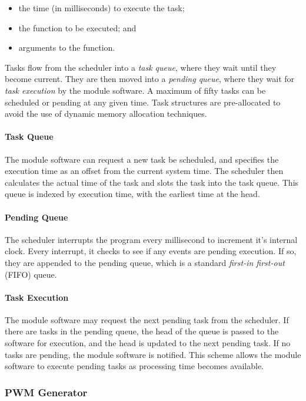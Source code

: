 \begin{itemize}
	\item the time (in milliseconds) to execute the task;
	\item the function to be executed; and
	\item arguments to the function.
\end{itemize}

Tasks flow from the scheduler into a \emph{task queue}, where they wait until they become current. They are then moved into a \emph{pending queue}, where they wait for \emph{task execution} by the module software. A maximum of fifty tasks can be scheduled or pending at any given time. Task structures are pre-allocated to avoid the use of dynamic memory allocation techniques.

\paragraph{Task Queue} The module software can request a new task be scheduled, and specifies the execution time as an offset from the current system time. The scheduler then calculates the actual time of the task and slots the task into the task queue. This queue is indexed by execution time, with the earliest time at the head.


\paragraph{Pending Queue}  The scheduler interrupts the program every millisecond to increment it's internal clock. Every interrupt, it checks to see if any events are pending execution. If so, they are appended to the pending queue, which is a standard \emph{first-in first-out} (FIFO) queue. 

\paragraph{Task Execution} The module software may request the next pending task from the scheduler. If there are tasks in the pending queue, the head of the queue is passed to the software for execution, and the head is updated to the next pending task. If no tasks are pending, the module software is notified. This scheme allows the module software to execute pending tasks as processing time becomes available.

\subsubsection{PWM Generator}

